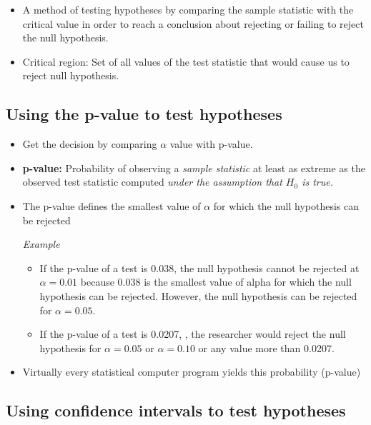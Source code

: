 \documentclass[]{book}
\begin{document}
\begin{itemize}
\item
  A method of testing hypotheses by comparing the sample statistic with the critical value in order to reach a conclusion about rejecting or failing to reject the null hypothesis.
\item
  Critical region: Set of all values of the test statistic that would cause us to reject null hypothesis.
\end{itemize}

\hypertarget{using-the-p-value-to-test-hypotheses}{%
\subsection{Using the p-value to test hypotheses}\label{using-the-p-value-to-test-hypotheses}}

\begin{itemize}
\item
  Get the decision by comparing \(\alpha\) value with p-value.
\item
  \textbf{p-value: } Probability of observing a \emph{sample statistic} at least as extreme as the observed test statistic computed \emph{under the assumption that \(H_0\) is true.}
\item
  The p-value defines the smallest value of \(\alpha\) for which the null hypothesis can be rejected

  \emph{Example}

  \begin{itemize}
  \item
    If the p-value of a test is 0.038, the null hypothesis cannot be rejected at \(\alpha =0.01\) because 0.038 is the smallest value of alpha for which the null hypothesis can be rejected. However, the null hypothesis can be rejected for \(\alpha = 0.05.\)
  \item
    If the p-value of a test is 0.0207, , the researcher would reject the null hypothesis for \(\alpha = 0.05\) or \(\alpha =0.10\) or any value more than 0.0207.
  \end{itemize}
\item
  Virtually every statistical computer program yields this probability (p-value)
\end{itemize}

\hypertarget{using-confidence-intervals-to-test-hypotheses}{%
\subsection{Using confidence intervals to test hypotheses}\label{using-confidence-intervals-to-test-hypotheses}}
\end{document}
